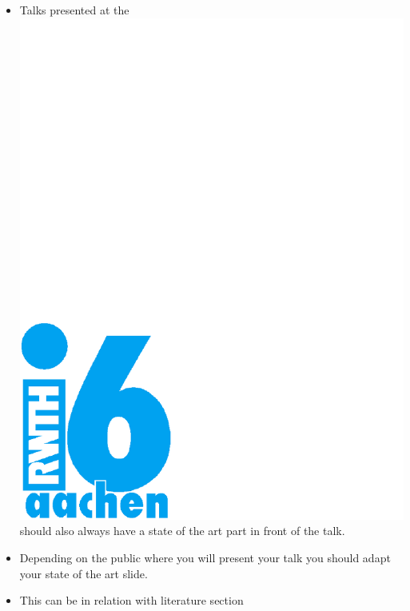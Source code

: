 \documentclass[11pt, a4paper, landscape]{article}
\begin{document}
\NewPage{} 
\vfill 
\begin{itemize}
\item Talks presented at the
  \href{http:://www-i6.rwth-aachen.de/}{\includegraphics[height=\baselineskip]{logos/i6-hks44}}
  should also always have a state of the art part in front of the talk.
\item Depending on the public where you will present your talk you should
adapt your state of the art slide.
\item This can be in relation with literature section
\end{itemize}
\vfill
\end{document}
